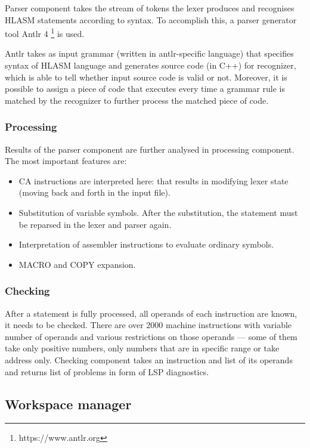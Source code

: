 Parser component takes the stream of tokens the lexer produces and recognises HLASM statements according to syntax. To accomplish this, a parser generator tool Antlr 4 \footnote{https://www.antlr.org} is used.

Antlr takes as input grammar (written in antlr-specific language) that specifies syntax of HLASM language and generates source code (in C++) for recognizer, which is able to tell whether input source code is valid or not. Moreover, it is possible to assign a piece of code that executes every time a grammar rule is matched by the recognizer to further process the matched piece of code.



\subsubsection{Processing}

Results of the parser component are further analysed in processing component. The most important features are:

\begin{itemize}
	\item CA instructions are interpreted here: that results in modifying lexer state (moving back and forth in the input file).
	\item Substitution of variable symbols. After the substitution, the statement must be reparsed in the lexer and parser again.
	\item Interpretation of assembler instructions to evaluate ordinary symbols.
	\item MACRO and COPY expansion.
\end{itemize}

\subsubsection{Checking}
After a statement is fully processed, all operands of each instruction are known, it needs to be checked. There are over 2000 machine instructions with variable number of operands and various restrictions on those operands --- some of them take only positive numbers, only numbers that are in specific range or take address only. Checking component takes an instruction and list of its operands and returns list of problems in form of LSP diagnostics.


\subsection{Workspace manager}

